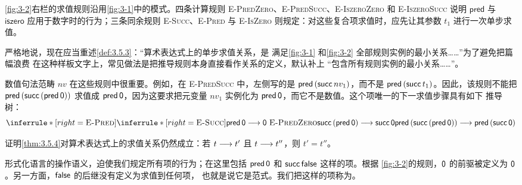\cref{fig:3-2}右栏的求值规则沿用\cref{fig:3-1}中的模式。四条计算规则
\textsc{E-PredZero}、\textsc{E-PredSucc}、\textsc{E-IszeroZero} 和
\textsc{E-IszeroSucc} 说明 \(\mathsf{pred}\) 与 \(\mathsf{iszero}\)
应用于数字时的行为；三条同余规则 \textsc{E-Succ}、\textsc{E-Pred} 与
\textsc{E-IsZero} 则规定：对这些复合项求值时，应先让其参数 \(t_1\)
进行一次单步求值。


严格地说，现在应当重述\cref{def:3.5.3}：“算术表达式上的单步求值关系，是
满足\cref{fig:3-1} 和\cref{fig:3-2} 全部规则实例的最小关系……”为了避免把篇幅浪费
在这种样板文字上，常见做法是把推导规则本身直接看作关系的定义，默认补上
“包含所有规则实例的最小关系……”。

数值句法范畴 \(nv\) 在这些规则中很重要。例如，在
\textsc{E-PredSucc} 中，左侧写的是
\(\mathsf{pred}\,(\mathsf{succ}\,nv_1)\)，而不是
\(\mathsf{pred}\,(\mathsf{succ}\,t_1)\)。因此，该规则不能把
\(\mathsf{pred}\,(\mathsf{succ}\,(\mathsf{pred}\,\mathsf{0}))\) 求值成
\(\mathsf{pred}\,\mathsf{0}\)，因为这要求把元变量 \(nv_1\) 实例化为
\(\mathsf{pred}\,\mathsf{0}\)，而它不是数值。这个项唯一的下一求值步骤具有如下
推导树：
\[
\inferrule*[right=\textsc{E-Pred}]
 {\inferrule*[right=\textsc{E-Succ}]
   {\taplpred{\taplzero}\trans\taplzero\ \textsc{E-PredZero}}
   {\taplsucc{(\taplpred{\taplzero})}\trans\taplsucc{\taplzero}}}
 {\taplpred{(\taplsucc{(\taplpred{\taplzero})})}
  \trans
  \taplpred{(\taplsucc{\taplzero})}}
\]

\begin{exercise}[\(\star\star\)]
\label{ex:3.5.14}
证明\cref{thm:3.5.4}对算术表达式上的求值关系仍然成立：若
\(t\mathrel{\longrightarrow} t'\) 且 \(t\mathrel{\longrightarrow} t''\)，则 \(t'=t''\)。
\end{exercise}

形式化语言的操作语义，迫使我们规定所有项的行为；在这里包括
\(\mathsf{pred}\,\mathsf{0}\) 和 \(\mathsf{succ}\,\mathsf{false}\) 这样的项。根据
\cref{fig:3-2}的规则，\(\mathsf{0}\) 的前驱被定义为
\(\mathsf{0}\)。另一方面，\(\mathsf{false}\) 的后继没有定义为求值到任何项，
也就是说它是范式。我们把这样的项称为。

